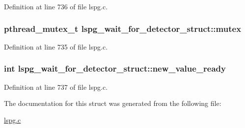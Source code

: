 Definition at line 736 of file lspg.c.\hypertarget{structlspg__wait__for__detector__struct_a958e9fe59e671e61f95c2ce796ba24ce}{
\subsubsection[{mutex}]{\setlength{\rightskip}{0pt plus 5cm}pthread\_\-mutex\_\-t {\bf lspg\_\-wait\_\-for\_\-detector\_\-struct::mutex}}}
\label{structlspg__wait__for__detector__struct_a958e9fe59e671e61f95c2ce796ba24ce}


Definition at line 735 of file lspg.c.\hypertarget{structlspg__wait__for__detector__struct_ad950e85c70c4473c5c7c40f8ceeae61d}{
\subsubsection[{new\_\-value\_\-ready}]{\setlength{\rightskip}{0pt plus 5cm}int {\bf lspg\_\-wait\_\-for\_\-detector\_\-struct::new\_\-value\_\-ready}}}
\label{structlspg__wait__for__detector__struct_ad950e85c70c4473c5c7c40f8ceeae61d}


Definition at line 737 of file lspg.c.

The documentation for this struct was generated from the following file:\begin{DoxyCompactItemize}
\item 
\hyperlink{lspg_8c}{lspg.c}\end{DoxyCompactItemize}
